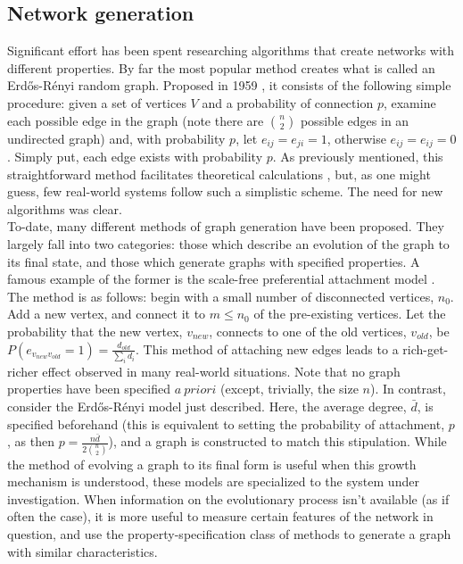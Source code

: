 \documentclass[11pt]{article}
\begin{document}
\subsection{Network generation}
Significant effort has been spent researching algorithms that create networks with different properties. By far the most popular method creates what is called an Erd\H{o}s-R\'{e}nyi random graph. Proposed in 1959 \cite{Erdos1959}, it consists of the following simple procedure: given a set of vertices $V$ and a probability of connection $p$, examine each possible edge in the graph (note there are ${n \choose 2}$ possible edges in an undirected graph) and, with probability $p$, let $e_{ij}=e_{ji}=1$, otherwise $e_{ij}=e_{ij}=0$. Simply put, each edge exists with probability $p$. As previously mentioned, this straightforward method facilitates theoretical calculations \cite{a couple math papers}, but, as one might guess, few real-world systems follow such a simplistic scheme. The need for new algorithms was clear. \vspace{1mm}\\
To-date, many different methods of graph generation have been proposed. They largely fall into two categories: those which describe an evolution of the graph to its final state, and those which generate graphs with specified properties. A famous example of the former is the scale-free preferential attachment model \cite{Barabasi1999}. The method is as follows: begin with a small number of disconnected vertices, $n_{0}$. Add a new vertex, and connect it to $m\le n_{0}$ of the pre-existing vertices. Let the probability that the new vertex, $v_{new}$, connects to one of the old vertices, $v_{old}$, be $P(e_{v_{new}v_{old}}=1)=\frac{d_{old}}{\sum\limits_{i} d_{i}}$. This method of attaching new edges leads to a rich-get-richer effect observed in many real-world situations. Note that no graph properties have been specified $a\ priori$ (except, trivially, the size $n$). In contrast, consider the Erd\H{o}s-R\'{e}nyi model just described. Here, the average degree, $\bar{d}$, is specified beforehand (this is equivalent to setting the probability of attachment, $p$, as then $p=\frac{n\bar{d}}{2 {n \choose 2}}$), and a graph is constructed to match this stipulation. While the method of evolving a graph to its final form is useful when this growth mechanism is understood, these models are specialized to the system under investigation. When information on the evolutionary process isn't available (as if often the case), it is more useful to measure certain features of the network in question, and use the property-specification class of methods to generate a graph with similar characteristics.\vspace{1mm}\\
\end{document}
